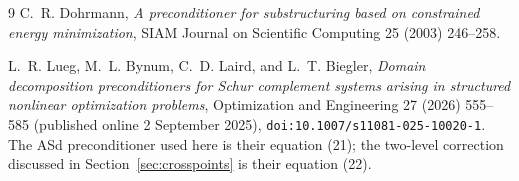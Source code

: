 \documentclass[11pt]{article}
\begin{document}
\begin{thebibliography}{9}
C.~R. Dohrmann,
\emph{A preconditioner for substructuring based on constrained energy
minimization},
SIAM Journal on Scientific Computing 25 (2003) 246--258.

L.~R. Lueg, M.~L. Bynum, C.~D. Laird, and L.~T. Biegler,
\emph{Domain decomposition preconditioners for Schur complement systems
arising in structured nonlinear optimization problems},
Optimization and Engineering 27 (2026) 555--585
(published online 2 September 2025), \texttt{doi:10.1007/s11081-025-10020-1}.
The ASd preconditioner used here is their equation (21); the two-level
correction discussed in Section~\ref{sec:crosspoints} is their equation (22).

\end{thebibliography}
\end{document}
